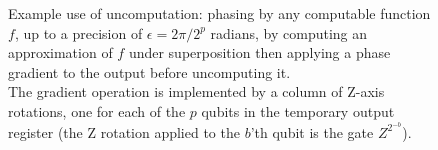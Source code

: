\documentclass[twocolumn,longbibliography]{quantumarticle-customized}
\begin{document}
\begin{figure}
  \caption{
	Example use of uncomputation: phasing by any computable function $f$, up to a precision of $\epsilon = 2 \pi / 2^p$ radians, by computing an approximation of $f$ under superposition then applying a phase gradient to the output before uncomputing it.
    \\
	The gradient operation is implemented by a column of Z-axis rotations, one for each of the $p$ qubits in the temporary output register (the Z rotation applied to the $b$'th qubit is the gate $Z^{2^{-b}}$).
  }
  \label{fig:phase-by-function}
\end{figure}
\end{document}
